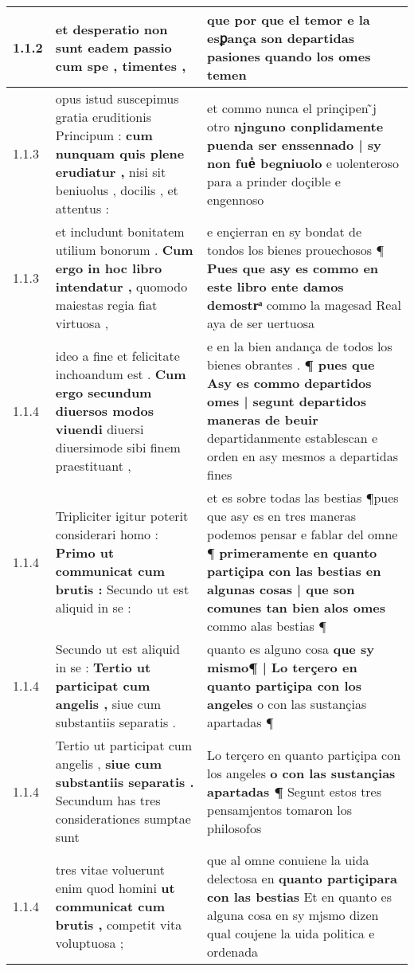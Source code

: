 \begin{tabular}{|p{1cm}|p{6.5cm}|p{6.5cm}|}
1.1.2 & et desperatio \textbf{ non sunt eadem passio cum spe , } timentes , & que por que el temor \textbf{ e la esꝑança son departidas pasiones } quando los omes temen \\\hline
1.1.3 & opus istud suscepimus gratia eruditionis Principum : \textbf{ cum nunquam quis plene erudiatur , } nisi sit beniuolus , docilis , et attentus : & et commo nunca el prinçipen ̃j otro \textbf{ njnguno conplidamente puenda ser enssennado | sy non fueᷤ begniuolo } e uolenteroso para a prinder doçible e engennoso \\\hline
1.1.3 & et includunt bonitatem utilium bonorum . \textbf{ Cum ergo in hoc libro intendatur , } quomodo maiestas regia fiat virtuosa , & e ençierran en sy bondat de tondos los bienes prouechosos ¶ \textbf{ Pues que asy es commo en este libro ente damos demostrͣ } commo la magesad Real aya de ser uertuosa \\\hline
1.1.4 & ideo a fine et felicitate inchoandum est . \textbf{ Cum ergo secundum diuersos modos viuendi } diuersi diuersimode sibi finem praestituant , & e en la bien andança de todos los bienes obrantes . \textbf{ ¶ pues que Asy es commo departidos omes | segunt departidos maneras de beuir } departidanmente establescan e orden en asy mesmos a departidas fines \\\hline
1.1.4 & Tripliciter igitur poterit considerari homo : \textbf{ Primo ut communicat cum brutis : } Secundo ut est aliquid in se : & et es sobre todas las bestias ¶pues que asy es en tres maneras podemos pensar e fablar del omne ¶ \textbf{ primeramente en quanto partiçipa con las bestias en algunas cosas | que son comunes tan bien alos omes } commo alas bestias ¶ \\\hline
1.1.4 & Secundo ut est aliquid in se : \textbf{ Tertio ut participat cum angelis , } siue cum substantiis separatis . & quanto es alguno cosa \textbf{ que sy mismo¶ | Lo terçero en quanto partiçipa con los angeles } o con las sustançias apartadas ¶ \\\hline
1.1.4 & Tertio ut participat cum angelis , \textbf{ siue cum substantiis separatis . } Secundum has tres considerationes sumptae sunt & Lo terçero en quanto partiçipa con los angeles \textbf{ o con las sustançias apartadas ¶ } Segunt estos tres pensamjentos tomaron los philosofos \\\hline
1.1.4 & tres vitae voluerunt enim quod homini \textbf{ ut communicat cum brutis , } competit vita voluptuosa ; & que al omne conuiene la uida delectosa en \textbf{ quanto partiçipara con las bestias } Et en quanto es alguna cosa en sy mjsmo dizen qual coujene la uida politica e ordenada \\\hline

\end{tabular}
